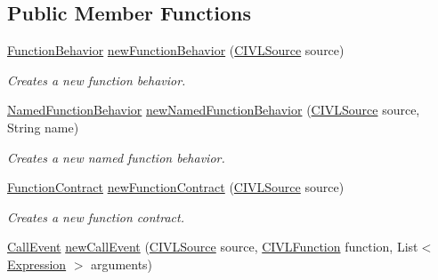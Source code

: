 \subsection*{Public Member Functions}
\begin{DoxyCompactItemize}
\item 
\hyperlink{interfaceedu_1_1udel_1_1cis_1_1vsl_1_1civl_1_1model_1_1IF_1_1contract_1_1FunctionBehavior}{Function\+Behavior} \hyperlink{interfaceedu_1_1udel_1_1cis_1_1vsl_1_1civl_1_1model_1_1IF_1_1contract_1_1ContractFactory_a41b4d27c5f9d0a5dee8a40831f83065e}{new\+Function\+Behavior} (\hyperlink{interfaceedu_1_1udel_1_1cis_1_1vsl_1_1civl_1_1model_1_1IF_1_1CIVLSource}{C\+I\+V\+L\+Source} source)
\begin{DoxyCompactList}\small\item\em Creates a new function behavior. \end{DoxyCompactList}\item 
\hyperlink{interfaceedu_1_1udel_1_1cis_1_1vsl_1_1civl_1_1model_1_1IF_1_1contract_1_1NamedFunctionBehavior}{Named\+Function\+Behavior} \hyperlink{interfaceedu_1_1udel_1_1cis_1_1vsl_1_1civl_1_1model_1_1IF_1_1contract_1_1ContractFactory_a95185bfc1468dd7519a9eb4d7a417f01}{new\+Named\+Function\+Behavior} (\hyperlink{interfaceedu_1_1udel_1_1cis_1_1vsl_1_1civl_1_1model_1_1IF_1_1CIVLSource}{C\+I\+V\+L\+Source} source, String name)
\begin{DoxyCompactList}\small\item\em Creates a new named function behavior. \end{DoxyCompactList}\item 
\hyperlink{interfaceedu_1_1udel_1_1cis_1_1vsl_1_1civl_1_1model_1_1IF_1_1contract_1_1FunctionContract}{Function\+Contract} \hyperlink{interfaceedu_1_1udel_1_1cis_1_1vsl_1_1civl_1_1model_1_1IF_1_1contract_1_1ContractFactory_a95aceb1100ab62389e217e75674e9a75}{new\+Function\+Contract} (\hyperlink{interfaceedu_1_1udel_1_1cis_1_1vsl_1_1civl_1_1model_1_1IF_1_1CIVLSource}{C\+I\+V\+L\+Source} source)
\begin{DoxyCompactList}\small\item\em Creates a new function contract. \end{DoxyCompactList}\item 
\hyperlink{interfaceedu_1_1udel_1_1cis_1_1vsl_1_1civl_1_1model_1_1IF_1_1contract_1_1CallEvent}{Call\+Event} \hyperlink{interfaceedu_1_1udel_1_1cis_1_1vsl_1_1civl_1_1model_1_1IF_1_1contract_1_1ContractFactory_a36047a841645940371076ead8eb225eb}{new\+Call\+Event} (\hyperlink{interfaceedu_1_1udel_1_1cis_1_1vsl_1_1civl_1_1model_1_1IF_1_1CIVLSource}{C\+I\+V\+L\+Source} source, \hyperlink{interfaceedu_1_1udel_1_1cis_1_1vsl_1_1civl_1_1model_1_1IF_1_1CIVLFunction}{C\+I\+V\+L\+Function} function, List$<$ \hyperlink{interfaceedu_1_1udel_1_1cis_1_1vsl_1_1civl_1_1model_1_1IF_1_1expression_1_1Expression}{Expression} $>$ arguments)

\end{DoxyCompactItemize}
